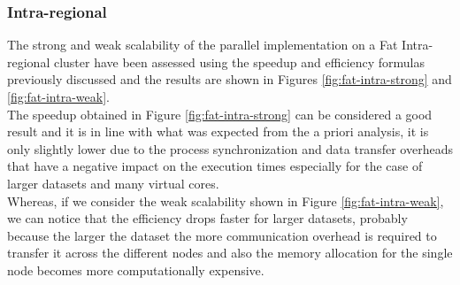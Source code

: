 \documentclass[final,5p,times,twocolumn,authoryear]{elsarticle}
\begin{document}
\subsubsection{Intra-regional}
The strong and weak scalability of the parallel implementation on a Fat Intra-regional cluster have been assessed using the speedup and efficiency formulas previously discussed and the results are shown in Figures \ref{fig:fat-intra-strong} and \ref{fig:fat-intra-weak}. \\
The speedup obtained in Figure \ref{fig:fat-intra-strong} can be considered a good result and it is in line with what was expected from the a priori analysis, it is only slightly lower due to the process synchronization and data transfer overheads that have a negative impact on the execution times especially for the case of larger datasets and many virtual cores. \\
Whereas, if we consider the weak scalability shown in Figure \ref{fig:fat-intra-weak}, we can notice that the efficiency drops faster for larger datasets, probably because the larger the dataset the more communication overhead is required to transfer it across the different nodes and also the memory allocation for the single node becomes more computationally expensive. 
\end{document}
